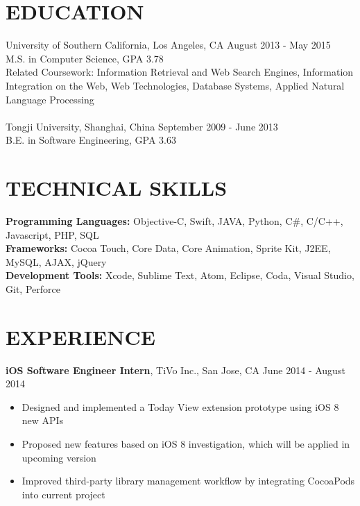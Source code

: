 \documentclass[line, overlapped]{res}
\begin{document}
\address{1133 W 36th Pl Apt 6, Los Angeles, CA 90007}
\address{(213) 806-0803, haishany@usc.edu, github.com/gabrielyeah, linkedin.com/in/haishanye}

\begin{resume}

\section{EDUCATION}
University of Southern California, Los Angeles, CA \hfill August 2013 - May 2015\\
M.S. in Computer Science, GPA 3.78\\
Related Coursework: Information Retrieval and Web Search Engines, Information Integration on the Web, Web Technologies, Database Systems, Applied Natural Language Processing\\
\\
Tongji University, Shanghai, China \hfill September 2009 - June 2013\\
B.E. in Software Engineering, GPA 3.63

\section{TECHNICAL SKILLS}
\textbf{Programming Languages:} Objective-C, Swift, JAVA, Python, C\#, C/C++, Javascript, PHP, SQL\\
\textbf{Frameworks:} Cocoa Touch, Core Data, Core Animation, Sprite Kit, J2EE, MySQL, AJAX, jQuery\\
\textbf{Development Tools:} Xcode, Sublime Text, Atom, Eclipse, Coda, Visual Studio, Git, Perforce

\section{EXPERIENCE}

\textbf{iOS Software Engineer Intern}, TiVo Inc., San Jose, CA \hfill June 2014 - August 2014
 \begin{itemize} \itemsep -2pt
 
 \item Designed and implemented a Today View extension prototype using iOS 8 new APIs
 
 \item Proposed new features based on iOS 8 investigation, which will be applied in upcoming version
 
 \item Improved third-party library management workflow by integrating CocoaPods into current project
 

\end{itemize}
\end{resume}
\end{document}
